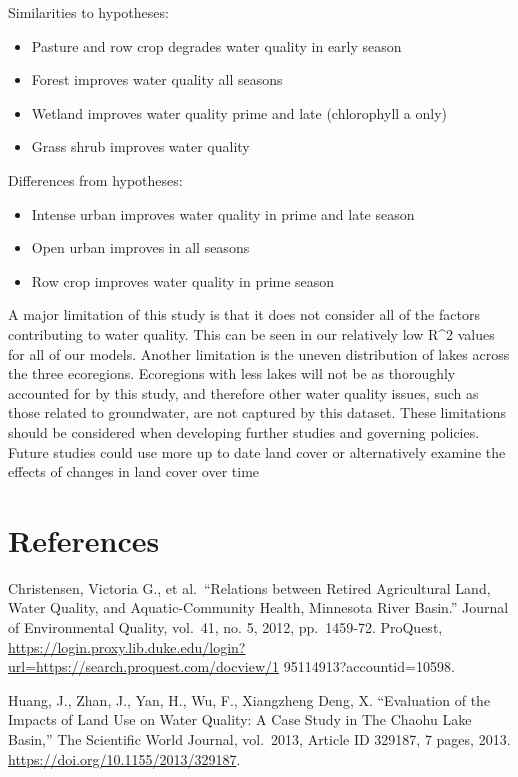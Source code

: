 \documentclass[12pt,]{article}
\providecommand{\tightlist}{%
  \setlength{\itemsep}{0pt}\setlength{\parskip}{0pt}}
\begin{document}
Similarities to hypotheses:

\begin{itemize}
\tightlist
\item
  Pasture and row crop degrades water quality in early season
\item
  Forest improves water quality all seasons
\item
  Wetland improves water quality prime and late (chlorophyll a only)
\item
  Grass shrub improves water quality
\end{itemize}

Differences from hypotheses:

\begin{itemize}
\tightlist
\item
  Intense urban improves water quality in prime and late season
\item
  Open urban improves in all seasons
\item
  Row crop improves water quality in prime season
\end{itemize}

A major limitation of this study is that it does not consider all of the
factors contributing to water quality. This can be seen in our
relatively low R\^{}2 values for all of our models. Another limitation
is the uneven distribution of lakes across the three ecoregions.
Ecoregions with less lakes will not be as thoroughly accounted for by
this study, and therefore other water quality issues, such as those
related to groundwater, are not captured by this dataset. These
limitations should be considered when developing further studies and
governing policies. Future studies could use more up to date land cover
or alternatively examine the effects of changes in land cover over time

\newpage

\hypertarget{references}{%
\section{References}\label{references}}

Christensen, Victoria G., et al.~``Relations between Retired
Agricultural Land, Water Quality, and Aquatic-Community Health,
Minnesota River Basin.'' Journal of Environmental Quality, vol.~41, no.
5, 2012, pp.~1459-72. ProQuest,
\url{https://login.proxy.lib.duke.edu/login?url=https://search.proquest.com/docview/1}
95114913?accountid=10598.

Huang, J., Zhan, J., Yan, H., Wu, F., Xiangzheng Deng, X. ``Evaluation
of the Impacts of Land Use on Water Quality: A Case Study in The Chaohu
Lake Basin,'' The Scientific World Journal, vol.~2013, Article ID
329187, 7 pages, 2013. \url{https://doi.org/10.1155/2013/329187}.
\end{document}
